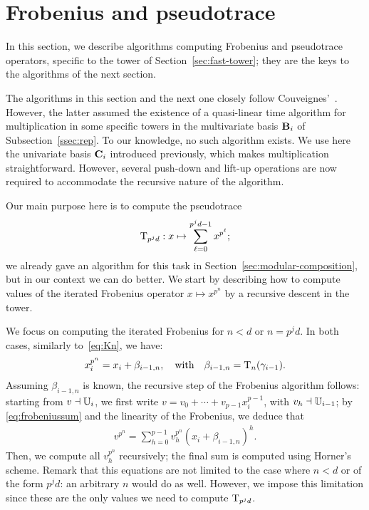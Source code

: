 \section{Frobenius and pseudotrace}
\label{sec:pseudotrace-frobenius}

In this section, we describe algorithms computing Frobenius
and pseudotrace operators, specific to the tower of
Section~\ref{sec:fast-tower}; they are the keys to the algorithms of
the next section.

The algorithms in this section and the next one closely follow
Couveignes'~\cite{couveignes00}. However, the latter assumed the
existence of a quasi-linear time algorithm for multiplication in some
specific towers in the multivariate basis $\mathbf{B}_i$ of
Subsection~\ref{ssec:rep}. To our knowledge, no such algorithm
exists. We use here the univariate basis $\mathbf{C}_i$ introduced
previously, which makes multiplication straightforward. However,
several push-down and lift-up operations are now required to
accommodate the recursive nature of the algorithm.

Our main purpose here is to compute the pseudotrace
\begin{equation}
  \label{eq:74}
  \operatorname{T}_{p^jd}:x\mapsto\sum_{\ell=0}^{p^jd-1}x^{p^{\ell}}
  \text{;}  
\end{equation}
we already gave an algorithm for this task in
Section~\ref{sec:modular-composition}, but in our context we can do
better. We start by describing how to compute values of the iterated
Frobenius operator $x \mapsto x^{p^n}$ by a recursive descent in the
tower.

We focus on computing the iterated Frobenius for $n<d$ or $n=p^jd$. In
both cases, similarly to~\eqref{eq:Kn}, we have:
\begin{gather}
  \label{eq:frobeniussum}
  x_i^{p^{n}} = x_i + \beta_{i-1,n}, \quad\text{with}\quad \beta_{i-1,n}=\operatorname{T}_{n}(\gamma_{i-1}).
\end{gather}
Assuming $\beta_{i-1,n}$ is known, the recursive step of the Frobenius
algorithm follows: starting from $v\dashv\mathbb{U}_i$, we first write
$v=v_0+\cdots+v_{p-1}x_i^{p-1}$, with $v_h\dashv\mathbb{U}_{i-1}$; by
\eqref{eq:frobeniussum} and the linearity of the Frobenius, we deduce
that
\begin{equation}
  \label{eq:frobeniuscomp}
\begin{array}{c}
v^{p^n}
  =\sum_{h=0}^{p-1} v_h^{p^n} \left(x_i + \beta_{i-1,n}\right)^{h}.
\end{array}
\end{equation}
Then, we compute all $v_h^{p^n}$ recursively; the final sum is
computed using Horner's scheme. Remark that this equations are not
limited to the case where $n<d$ or of the form $p^jd$: an arbitrary
$n$ would do as well. However, we impose this limitation since these
are the only values we need to compute $\operatorname{T}_{p^jd}$.


